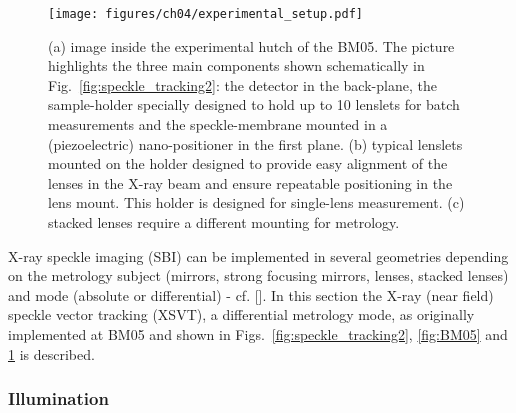 \begin{refsection}
\begin{figure}[t]
        \centering
        {\texttt{[image: figures/ch04/experimental\_setup.pdf]}}
        \caption[Experimental setup at the BM05 beamline, ESRF.]{(a) image inside the experimental hutch of the BM05. The picture highlights the three main components shown schematically in Fig.~\ref{fig:speckle_tracking2}: the detector in the back-plane, the sample-holder specially designed to hold up to 10 lenslets for batch measurements and the speckle-membrane mounted in a (piezoelectric) nano-positioner in the first plane. (b) typical lenslets mounted on the holder designed to provide easy alignment of the lenses in the X-ray beam and ensure repeatable positioning in the lens mount. This holder is designed for single-lens measurement. (c) stacked lenses require a different mounting for metrology.} \label{fig:experimental_setup}
\end{figure}


X-ray speckle imaging (SBI) can be implemented in several geometries depending on the metrology subject (mirrors, strong focusing mirrors, lenses, stacked lenses) and mode (absolute or differential) - cf. [\cite{Berujon2020a}]. In this section the X-ray (near field) speckle vector tracking (XSVT), a differential metrology mode, as originally implemented at BM05 and shown in Figs.~\ref{fig:speckle_tracking2}, \ref{fig:BM05} and \ref{fig:experimental_setup} is described.

\subsubsection*{Illumination}


\end{refsection}
